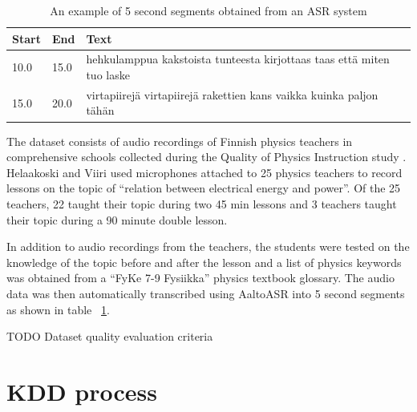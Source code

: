 \documentclass[utf8,english]{gradu3}
\begin{document}
\begin{table}[]
  \begin{tabular}{ | l | l | l |}
  \hline
  \textbf{Start} & \textbf{End}  & \textbf{Text} \\ \hline
  10.0 & 15.0 & hehkulamppua kakstoista tunteesta kirjottaas taas että miten tuo laske\\ \hline
  15.0 & 20.0 & virtapiirejä virtapiirejä rakettien kans vaikka kuinka paljon tähän\\
  \hline
  \end{tabular}
  \caption{An example of 5 second segments obtained from an ASR system}
  \label{table:transcript}
\end{table}

The dataset consists of audio recordings of Finnish physics teachers in comprehensive schools collected during the Quality of Physics Instruction study \parencite{fischerQualityInstructionPhysics2014,helaakoskiContentContentStructure2014}. Helaakoski and Viiri \parencite*{helaakoskiContentContentStructure2014} used microphones attached to 25 physics teachers to record lessons on the topic of \enquote{relation between electrical energy and power}. Of the 25 teachers, 22 taught their topic during two 45 min lessons and 3 teachers taught their topic during a 90 minute double lesson. 

In addition to audio recordings from the teachers, the students were tested on the knowledge of the topic before and after the lesson and a list of physics keywords was obtained from a \enquote{FyKe 7-9 Fysiikka}\parencite{kangaskorteFyKeFysiikkaOPS2016} physics textbook glossary. The audio data was then automatically transcribed using AaltoASR into 5 second segments \parencite{hirsimakiImportanceHighOrderNGram2009} as shown in table ~\ref{table:transcript}.


TODO Dataset quality evaluation criteria



\section{KDD process}
\end{document}
